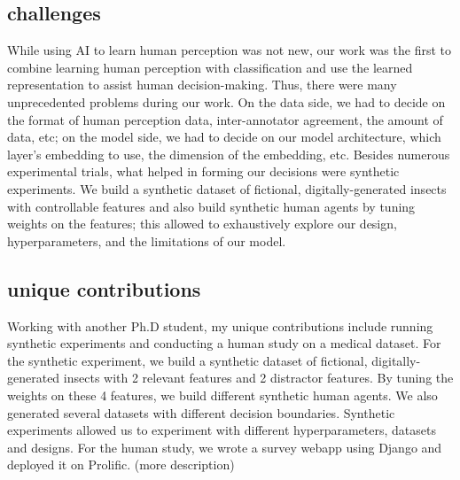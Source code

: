 

\subsection{challenges}
While using AI to learn human perception was not new, our work was the first to combine learning human perception with classification and use the learned representation to assist human decision-making. Thus, there were many unprecedented problems during our work. On the data side, we had to decide on the format of human perception data, inter-annotator agreement, the amount of data, etc; on the model side, we had to decide on our model architecture, which layer's embedding to use, the dimension of the embedding, etc. Besides numerous experimental trials, what helped in forming our decisions were synthetic experiments. We build a synthetic dataset of fictional, digitally-generated insects with controllable features and also build synthetic human agents by tuning weights on the features; this allowed to exhaustively explore our design, hyperparameters, and the limitations of our model.

\subsection{unique contributions}
Working with another Ph.D student, my unique contributions include running synthetic experiments and conducting a human study on a medical dataset. For the synthetic experiment, we build a synthetic dataset of fictional, digitally-generated insects with 2 relevant features and 2 distractor features. By tuning the weights on these 4 features, we build different synthetic human agents. We also generated several datasets with different decision boundaries. Synthetic experiments allowed us to experiment with different hyperparameters, datasets and designs. For the human study, we wrote a survey webapp using Django and deployed it on Prolific. (more description)


